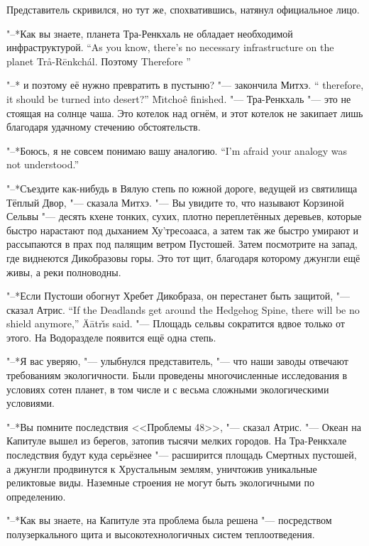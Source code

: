 Представитель скривился, но тут же, спохватившись, натянул официальное лицо.

{"--*Как вы знаете, планета Тра-Ренкхаль не обладает необходимой инфраструктурой.}
{``As you know, there's no necessary infrastructure on the planet Tr\r{a}-R\={e}nkch\'{a}l.}
{Поэтому\ldotst}
{Therefore \ldotst ''}

{"--* \ldotst и поэтому её нужно превратить в пустыню? "--- закончила Митхэ.}
{`` \ldotst therefore, it should be turned into desert?'' M\={\i}tcho\^{e} finished.}
"--- Тра-Ренкхаль "--- это не стоящая на солнце чаша.
Это котелок над огнём, и этот котелок не закипает лишь благодаря удачному стечению обстоятельств.

{"--*Боюсь, я не совсем понимаю вашу аналогию.}
{``I'm afraid your analogy was not understood.''}

"--*Съездите как-нибудь в Вялую степь по южной дороге, ведущей из святилища Тёплый Двор, "--- сказала Митхэ.
"--- Вы увидите то, что называют Корзиной Сельвы "--- десять кхене тонких, сухих, плотно переплетённых деревьев, которые быстро нарастают под дыханием Ху'тресоааса, а затем так же быстро умирают и рассыпаются в прах под палящим ветром Пустошей.
Затем посмотрите на запад, где виднеются Дикобразовы горы.
Это тот щит, благодаря которому джунгли ещё живы, а реки полноводны.

{"--*Если Пустоши обогнут Хребет Дикобраза, он перестанет быть защитой, "--- сказал Атрис.}
{``If the Deadlands get around the Hedgehog Spine, there will be no shield anymore,'' \"{A}\={a}tr\v{\i}s said.}
"--- Площадь сельвы сократится вдвое только от этого.
На Водоразделе появится ещё одна степь.

"--*Я вас уверяю, "--- улыбнулся представитель, "--- что наши заводы отвечают требованиям экологичности.
Были проведены многочисленные исследования в условиях сотен планет, в том числе и с весьма сложными экологическими условиями.

"--*Вы помните последствия <<Проблемы 48>>, "--- сказал Атрис.
"--- Океан на Капитуле вышел из берегов, затопив тысячи мелких городов.
На Тра-Ренкхале последствия будут куда серьёзнее "--- расширится площадь Смертных пустошей, а джунгли продвинутся к Хрустальным землям, уничтожив уникальные реликтовые виды.
Наземные строения не могут быть экологичными по определению.

"--*Как вы знаете, на Капитуле эта проблема была решена "--- посредством полузеркального щита и высокотехнологичных систем теплоотведения.

